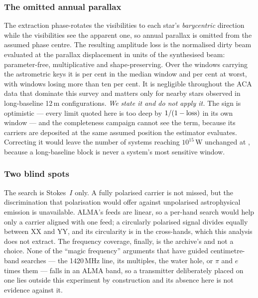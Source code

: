 \subsubsection{The omitted annual parallax} \label{sec:parallax}

The extraction phase-rotates the visibilities to each star's
\emph{barycentric} direction while the visibilities see the apparent one, so
annual parallax is omitted from the assumed phase centre. The resulting
amplitude loss is the normalised dirty beam evaluated at the parallax
displacement in units of the synthesised beam: parameter-free,
multiplicative and shape-preserving. Over the \PxNWin{} windows carrying the
astrometric keys it is \PxLossMedPct{} per cent in the median window and
\PxLossMaxPct{} per cent at worst, with \PxNGtTen{} windows losing more than
ten per cent. It is negligible throughout the ACA data that dominate this
survey and matters only for nearby stars observed in long-baseline 12\,m
configurations. \emph{We state it and do not apply it.} The sign is
optimistic --- every limit quoted here is too deep by $1/(1-{\rm loss})$ in
its own window --- and the completeness campaign cannot see the term,
because its carriers are deposited at the same assumed position the
estimator evaluates. Correcting it would leave the number of systems
reaching $10^{15}$\,W unchanged at \PxNSysCorr, because a long-baseline
block is never a system's most sensitive window.

\subsubsection{Two blind spots}

The search is Stokes~$I$ only. A fully polarised carrier is not missed, but
the discrimination that polarisation would offer against unpolarised
astrophysical emission is unavailable. ALMA's feeds are linear, so a
per-hand search would help only a carrier aligned with one feed; a
circularly polarised signal divides equally between XX and YY, and its
circularity is in the cross-hands, which this analysis does not extract.
The frequency coverage, finally, is the archive's and not a choice. None of
the ``magic frequency'' arguments that have guided centimetre-band searches
--- the 1420\,MHz line, its multiples, the water hole, or $\pi$ and $e$
times them --- falls in an ALMA band, so a transmitter deliberately placed
on one lies outside this experiment by construction and its absence here is
not evidence against it.

